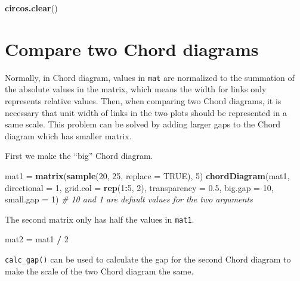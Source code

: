 \documentclass[]{book}
\newenvironment{Shaded}{\begin{snugshade}}{\end{snugshade}}
\newcommand{\KeywordTok}[1]{\textcolor[rgb]{0.13,0.29,0.53}{\textbf{#1}}}
\newcommand{\DataTypeTok}[1]{\textcolor[rgb]{0.13,0.29,0.53}{#1}}
\newcommand{\DecValTok}[1]{\textcolor[rgb]{0.00,0.00,0.81}{#1}}
\newcommand{\FloatTok}[1]{\textcolor[rgb]{0.00,0.00,0.81}{#1}}
\newcommand{\StringTok}[1]{\textcolor[rgb]{0.31,0.60,0.02}{#1}}
\newcommand{\CommentTok}[1]{\textcolor[rgb]{0.56,0.35,0.01}{\textit{#1}}}
\newcommand{\OtherTok}[1]{\textcolor[rgb]{0.56,0.35,0.01}{#1}}
\newcommand{\OperatorTok}[1]{\textcolor[rgb]{0.81,0.36,0.00}{\textbf{#1}}}
\newcommand{\NormalTok}[1]{#1}
\begin{document}
\begin{Shaded}
\begin{Highlighting}[]
\KeywordTok{circos.clear}\NormalTok{()}
\end{Highlighting}
\end{Shaded}

\section{Compare two Chord diagrams}\label{compare-two-chord-diagrams}

Normally, in Chord diagram, values in \texttt{mat} are normalized to the
summation of the absolute values in the matrix, which means the width
for links only represents relative values. Then, when comparing two
Chord diagrams, it is necessary that unit width of links in the two
plots should be represented in a same scale. This problem can be solved
by adding larger gaps to the Chord diagram which has smaller matrix.

First we make the ``big'' Chord diagram.

\begin{Shaded}
\begin{Highlighting}[]
\NormalTok{mat1 =}\StringTok{ }\KeywordTok{matrix}\NormalTok{(}\KeywordTok{sample}\NormalTok{(}\DecValTok{20}\NormalTok{, }\DecValTok{25}\NormalTok{, }\DataTypeTok{replace =} \OtherTok{TRUE}\NormalTok{), }\DecValTok{5}\NormalTok{)}
\KeywordTok{chordDiagram}\NormalTok{(mat1, }\DataTypeTok{directional =} \DecValTok{1}\NormalTok{, }\DataTypeTok{grid.col =} \KeywordTok{rep}\NormalTok{(}\DecValTok{1}\OperatorTok{:}\DecValTok{5}\NormalTok{, }\DecValTok{2}\NormalTok{), }\DataTypeTok{transparency =} \FloatTok{0.5}\NormalTok{,}
    \DataTypeTok{big.gap =} \DecValTok{10}\NormalTok{, }\DataTypeTok{small.gap =} \DecValTok{1}\NormalTok{) }\CommentTok{# 10 and 1 are default values for the two arguments}
\end{Highlighting}
\end{Shaded}

The second matrix only has half the values in \texttt{mat1}.

\begin{Shaded}
\begin{Highlighting}[]
\NormalTok{mat2 =}\StringTok{ }\NormalTok{mat1 }\OperatorTok{/}\StringTok{ }\DecValTok{2}
\end{Highlighting}
\end{Shaded}

\texttt{calc\_gap()} can be used to calculate the gap for the second
Chord diagram to make the scale of the two Chord diagram the same.
\end{document}

